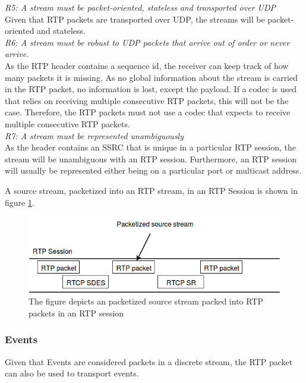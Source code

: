 \noindent\textit{R5: A stream must be packet-oriented, stateless and transported over UDP} \\
Given that RTP packets are transported over UDP, the streams will be packet-oriented and stateless.\\

\noindent\textit{R6: A stream must be robust to UDP packets that arrive out of order or never arrive.} \\
As the RTP header contains a sequence id, the receiver can keep track of how many packets it is missing. As no global information about the stream is carried in the RTP packet, no information is lost, except the payload. If a codec is used that relies on receiving multiple consecutive RTP packets, this will not be the case. Therefore, the RTP packets must not use a codec that expects to receive multiple consecutive RTP packets. \\

\noindent\textit{R7: A stream must be represented unambiguously} \\
As the header contains an SSRC that is unique in a particular RTP session, the stream will be unambiguous with an RTP session. Furthermore, an RTP session will usually be represented either being on a particular port or multicast address.


A source stream, packetized into an RTP stream, in an RTP Session is shown in figure \ref{fig:design:stream}.

\begin{figure}[H]
	\centering
	\includegraphics[width=\textwidth]{figures/sourcestream-in-rtp}
	\caption{The figure depicts an packetized source stream packed into RTP packets in an RTP session}
	\label{fig:design:stream}
\end{figure}


\subsubsection{Events}
Given that Events are considered packets in a discrete stream, the RTP packet can also be used to transport events.\\

